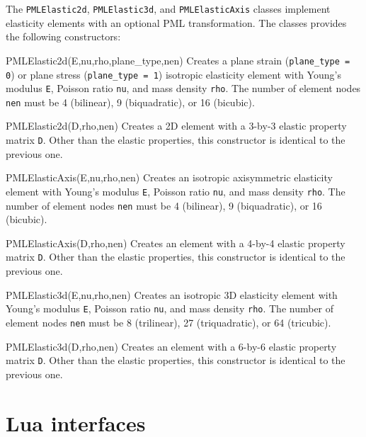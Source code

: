 \documentclass{article}
\newenvironment{codelist}[1][\quad]%
  {\begin{list}{}{%
   \settowidth{\labelwidth}{\texttt{#1}\hfil}%
   \setlength{\leftmargin}{\labelwidth}%
   \addtolength{\leftmargin}{\labelsep}%
   \addtolength{\leftmargin}{\parindent}%
   \renewcommand{\makelabel}[1]{\texttt{##1}}}}%
  {\end{list}}
\newcommand{\ttt}[1]{\texttt{#1}}
\begin{document}
The \ttt{PMLElastic2d}, \ttt{PMLElastic3d}, and \ttt{PMLElasticAxis}
classes implement elasticity elements with an optional PML
transformation.  The classes provides the following constructors:
\begin{codelist}

  \item[PMLElastic2d(E,nu,rho,plane\_type,nen)]
    Creates a plane strain (\ttt{plane\_type = 0}) or plane stress
    (\ttt{plane\_type = 1}) isotropic elasticity element with
    Young's modulus \ttt{E}, Poisson ratio \ttt{nu}, and mass
    density \ttt{rho}.  The number of element nodes \ttt{nen}
    must be 4 (bilinear), 9 (biquadratic), or 16 (bicubic).

  \item[PMLElastic2d(D,rho,nen)]
    Creates a 2D element with a 3-by-3 elastic property matrix
    \ttt{D}.  Other than the elastic properties, this constructor
    is identical to the previous one.

  \item[PMLElasticAxis(E,nu,rho,nen)]
    Creates an isotropic axisymmetric elasticity element with
    Young's modulus \ttt{E}, Poisson ratio \ttt{nu}, and mass
    density \ttt{rho}.  The number of element nodes \ttt{nen}
    must be 4 (bilinear), 9 (biquadratic), or 16 (bicubic).

  \item[PMLElasticAxis(D,rho,nen)]
    Creates an element with a 4-by-4 elastic property matrix
    \ttt{D}.  Other than the elastic properties, this constructor
    is identical to the previous one.

  \item[PMLElastic3d(E,nu,rho,nen)] 
    Creates an isotropic 3D elasticity element with Young's modulus
    \ttt{E}, Poisson ratio \ttt{nu}, and mass density
    \ttt{rho}.  The number of element nodes \ttt{nen} must be 8
    (trilinear), 27 (triquadratic), or 64 (tricubic).

  \item[PMLElastic3d(D,rho,nen)]
    Creates an element with a 6-by-6 elastic property matrix
    \ttt{D}.  Other than the elastic properties, this constructor
    is identical to the previous one.

\end{codelist}



\section{Lua interfaces}
\end{document}
